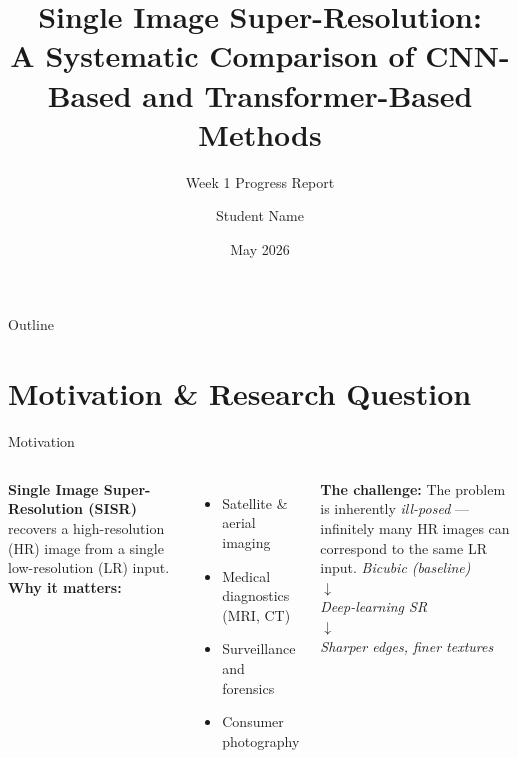 \documentclass[aspectratio=169]{beamer}
\title[SISR: CNN vs.\ Transformer]{Single Image Super-Resolution:\\
A Systematic Comparison of CNN-Based and Transformer-Based Methods}
\subtitle{Week 1 Progress Report}
\author{Student Name}
\institute{M.Sc.\ MISCADA · Durham University}
\date{May 2026}
\begin{document}
\begin{frame}
  \titlepage
\end{frame}

\begin{frame}{Outline}
  \tableofcontents
\end{frame}

\section{Motivation \& Research Question}

\begin{frame}{Motivation}
  \begin{columns}
      \textbf{Single Image Super-Resolution (SISR)} recovers a high-resolution (HR) image from a single low-resolution (LR) input.\\[6pt]
      \textbf{Why it matters:}
      \begin{itemize}
        \item Satellite \& aerial imaging
        \item Medical diagnostics (MRI, CT)
        \item Surveillance and forensics
        \item Consumer photography
      \end{itemize}
      \vspace{6pt}
      \textbf{The challenge:} The problem is inherently \emph{ill-posed} — infinitely many HR images can correspond to the same LR input.
      \centering
      \textit{Bicubic (baseline)}\\[4pt]
      $\downarrow$\\[2pt]
      \textit{Deep-learning SR}\\[4pt]
      $\downarrow$\\[2pt]
      \textit{Sharper edges, finer textures}
  \end{columns}
\end{frame}
\end{document}
